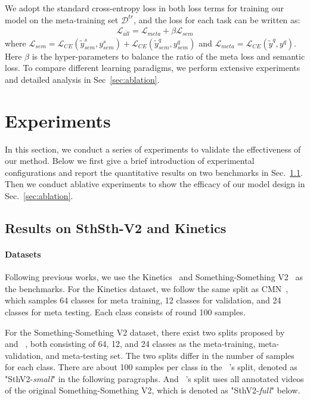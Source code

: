 \documentclass{article}
\begin{document}
We adopt the standard cross-entropy loss in both loss terms for training our model on the meta-training set $\mathcal{D}^{tr}$, and the loss for each task can be written as:
\begin{align}
	\mathcal{L}_{all}=\mathcal{L}_{meta}+\beta\mathcal{L}_{sem}
	\end{align}
where $\mathcal{L}_{sem}=\mathcal{L}_{CE}(\tilde{y}^s_{sem},y^s_{sem})+\mathcal{L}_{CE}(\tilde{y}_{sem}^q,y_{sem}^q)$ and $\mathcal{L}_{meta}=\mathcal{L}_{CE}(\tilde{y}^q,y^q)$. Here $\beta$ is the hyper-parameters to balance the ratio of the meta loss and semantic loss. To compare different learning paradigms, we perform extensive experiments and detailed analysis in Sec~\ref{sec:ablation}.



 


\section{Experiments}\label{sec:cls_experiment}
In this section, we conduct a series of experiments to validate the effectiveness of our method.
Below we first give a brief introduction of experimental configurations and report the quantitative results on two benchmarks in Sec.~\ref{sec:configuration}. Then we conduct ablative experiments to show the efficacy of our model design in Sec.~\ref{sec:ablation}.


\subsection{Results on SthSth-V2 and Kinetics}\label{sec:configuration}
\paragraph{Datasets}
Following previous works, we use the Kinetics~\cite{Carreira_2017_CVPR} and Something-Something V2~\cite{goyal2017something} as the benchmarks. For the Kinetics dataset, we follow the same split as CMN~\cite{zhu2018compound}, which samples 64 classes for meta training, 12 classes for validation, and 24 classes for meta testing. Each class consists of round 100 samples. 

For the Something-Something V2 dataset, there exist two splits proposed by ~\cite{cao2020few} and ~\cite{zhu2020label}, both consisting of 64, 12, and 24 classes as the meta-training, meta-validation, and meta-testing set. The two splits differ in the number of samples for each class. There are about 100 samples per class in the ~\cite{zhu2020label}'s split, denoted as "SthV2-\textit{small}" in the following paragraphs. And ~\cite{cao2020few}'s split uses all annotated videos of the original Something-Something V2, which is denoted as "SthV2-\textit{full}" below.
\end{document}
